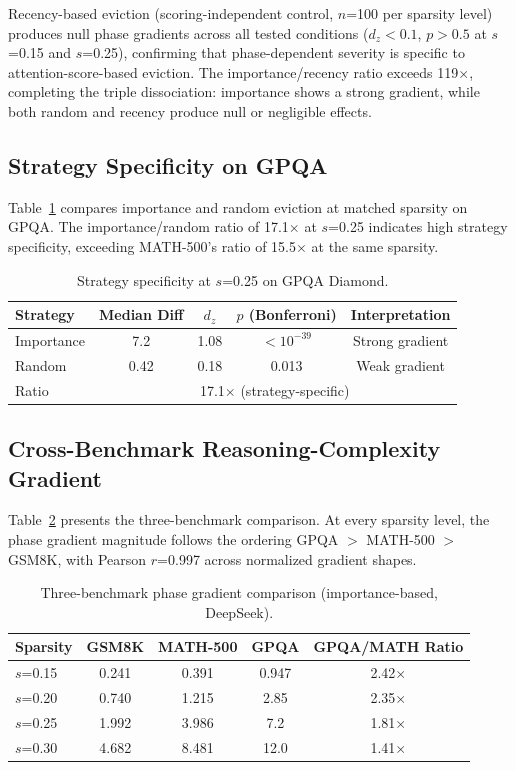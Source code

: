 \documentclass[11pt,a4paper]{article}
\begin{document}
Recency-based eviction (scoring-independent control, $n$=100 per sparsity level) produces null phase gradients across all tested conditions ($d_z < 0.1$, $p > 0.5$ at $s$=0.15 and $s$=0.25), confirming that phase-dependent severity is specific to attention-score-based eviction. The importance/recency ratio exceeds 119$\times$, completing the triple dissociation: importance shows a strong gradient, while both random and recency produce null or negligible effects.

\subsection{Strategy Specificity on GPQA}

Table~\ref{tab:gpqa_specificity} compares importance and random eviction at matched sparsity on GPQA. The importance/random ratio of 17.1$\times$ at $s$=0.25 indicates high strategy specificity, exceeding MATH-500's ratio of 15.5$\times$ at the same sparsity.

\begin{table}[h]
\centering
\caption{Strategy specificity at $s$=0.25 on GPQA Diamond.}
\label{tab:gpqa_specificity}
\begin{tabular}{lcccc}
\toprule
Strategy & Median Diff & $d_z$ & $p$ (Bonferroni) & Interpretation \\
\midrule
Importance & 7.2 & 1.08 & $<10^{-39}$ & Strong gradient \\
Random & 0.42 & 0.18 & 0.013 & Weak gradient \\
\midrule
Ratio & \multicolumn{4}{c}{17.1$\times$ (strategy-specific)} \\
\bottomrule
\end{tabular}
\end{table}

\subsection{Cross-Benchmark Reasoning-Complexity Gradient}

Table~\ref{tab:cross_benchmark} presents the three-benchmark comparison. At every sparsity level, the phase gradient magnitude follows the ordering GPQA $>$ MATH-500 $>$ GSM8K, with Pearson $r$=0.997 across normalized gradient shapes.

\begin{table}[h]
\centering
\caption{Three-benchmark phase gradient comparison (importance-based, DeepSeek).}
\label{tab:cross_benchmark}
\begin{tabular}{lcccc}
\toprule
Sparsity & GSM8K & MATH-500 & GPQA & GPQA/MATH Ratio \\
\midrule
$s$=0.15 & 0.241 & 0.391 & 0.947 & 2.42$\times$ \\
$s$=0.20 & 0.740 & 1.215 & 2.85 & 2.35$\times$ \\
$s$=0.25 & 1.992 & 3.986 & 7.2 & 1.81$\times$ \\
$s$=0.30 & 4.682 & 8.481 & 12.0 & 1.41$\times$ \\
\bottomrule
\end{tabular}
\end{table}
\end{document}
